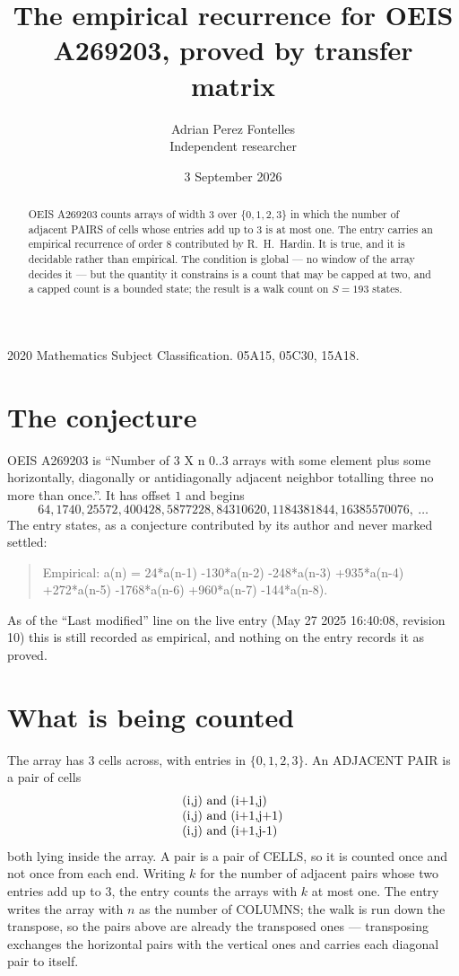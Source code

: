 \documentclass[11pt,a4paper]{article}
\title{The empirical recurrence for OEIS A269203, proved by transfer matrix}
\author{Adrian Perez Fontelles\\ \small Independent researcher}
\date{3 September 2026}
\theoremstyle{plain}
\theoremstyle{definition}
\begin{document}
\maketitle

\begin{abstract}
OEIS A269203 counts arrays of width $3$ over $\{0,1,2,3\}$ in which the number of adjacent PAIRS of
cells whose entries add up to $3$ is at most one. The entry carries an empirical recurrence of
order $8$ contributed by R.~H.~Hardin. It is true, and it is decidable rather than
empirical. The condition is global --- no window of the array decides it --- but the quantity
it constrains is a count that may be capped at two, and a capped count is a bounded state; the
result is a walk count on $S=193$ states.
\end{abstract}

\noindent\small 2020 Mathematics Subject Classification. 05A15, 05C30, 15A18.\normalsize

\section{The conjecture}

OEIS A269203 is ``Number of 3 X n 0..3 arrays with some element plus some horizontally, diagonally or antidiagonally adjacent neighbor totalling three no more than once.''. It has offset $1$ and begins
\[
64, 1740, 25572, 400428, 5877228, 84310620, 1184381844, 16385570076,\ \dots
\]
The entry states, as a conjecture contributed by its author and never marked settled:
\begin{quote}
Empirical: a(n) = 24*a(n-1) -130*a(n-2) -248*a(n-3) +935*a(n-4) +272*a(n-5) -1768*a(n-6) +960*a(n-7) -144*a(n-8).
\end{quote}
As of the ``Last modified'' line on the live entry (May 27 2025 16:40:08, revision 10) this is still
recorded as empirical, and nothing on the entry records it as proved.

\section{What is being counted}

The array has $3$ cells across, with entries in $\{0,1,2,3\}$. An ADJACENT PAIR is a pair of cells
\[
\begin{array}{l}
$(i,j)\text{ and }(i{+}1,j)$ \\
$(i,j)\text{ and }(i{+}1,j{+}1)$ \\
$(i,j)\text{ and }(i{+}1,j{-}1)$ \\
\end{array}
\]
both lying inside the array. A pair is a pair of CELLS, so it is counted once and not once from
each end. Writing $k$ for the number of adjacent pairs whose two entries add up to $3$, the
entry counts the arrays with $k$ at most one. The entry writes the array with $n$ as the number of COLUMNS; the walk is run down the transpose, so the pairs above are already the transposed ones --- transposing exchanges the horizontal pairs with the vertical ones and carries each diagonal pair to itself.
\end{document}
